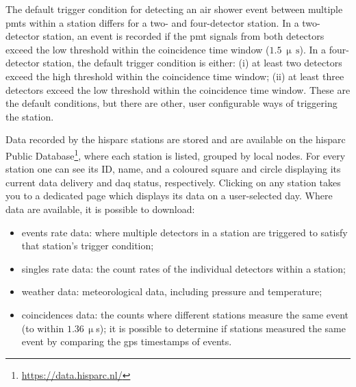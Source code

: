 The default trigger condition for detecting an air shower event between multiple \glspl{pmt} within a station differs for a two- and four-detector station. In a two-detector station, an event is recorded if the \gls{pmt} signals from both detectors exceed the low threshold within the coincidence time window ($1.5~\upmu\,\mathrm{s}$). In a four-detector station, the default trigger condition is either: (i) at least two detectors exceed the high threshold within the coincidence time window; (ii) at least three detectors exceed the low threshold within the coincidence time window. These are the default conditions, but there are other, user configurable ways of triggering the station.




Data recorded by the \gls{hisparc} stations are stored and are available on the \gls{hisparc} Public Database\footnote{\url{https://data.hisparc.nl/}}, where each station is listed, grouped by local nodes. For every station one can see its ID, name, and a coloured square and circle displaying its current data delivery and \gls{daq} status, respectively. Clicking on any station takes you to a dedicated page which displays its data on a user-selected day. Where data are available, it is possible to download: %
%
\begin{itemize}
	\item{events rate data: where multiple detectors in a station are triggered to satisfy that station's trigger condition;}
	\item{singles rate data: the count rates of the individual detectors within a station;}
	\item{weather data: meteorological data, including pressure and temperature;}
	\item{coincidences data: the counts where different stations measure the same event (to within $1.36 \, \upmu$s); it is possible to determine if stations measured the same event by comparing the \gls{gps} timestamps of events.}
\end{itemize}

